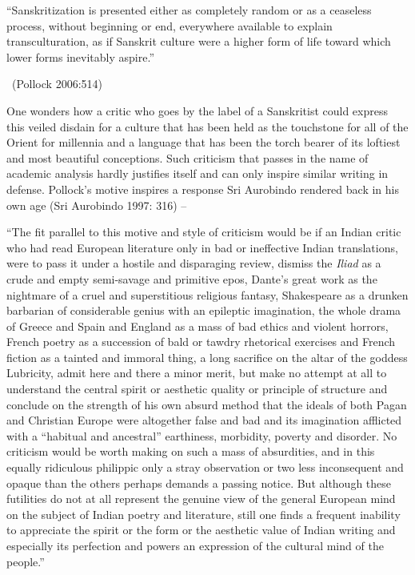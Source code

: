 \begin{myquote}
“Sanskritization is presented either as completely random or as a ceaseless process, without beginning or end, everywhere available to explain transculturation, as if Sanskrit culture were a higher form of life toward which lower forms inevitably aspire.” 

~\hfill (Pollock 2006:514)
\end{myquote}

One wonders how a critic who goes by the label of a Sanskritist could express this veiled disdain for a culture that has been held as the touchstone for all of the Orient for millennia and a language that has been the torch bearer of its loftiest and most beautiful conceptions. Such criticism that passes in the name of academic analysis hardly justifies itself and can only inspire similar writing in defense. Pollock’s motive inspires a response Sri Aurobindo rendered back in his own age (Sri Aurobindo 1997: 316) –

\begin{myquote}
“The fit parallel to this motive and style of criticism would be if an Indian critic who had read European literature only in bad or ineffective Indian translations, were to pass it under a hostile and disparaging review, dismiss the \textit{Iliad} as a crude and empty semi-savage and primitive epos, Dante’s great work as the nightmare of a cruel and superstitious religious fantasy, Shakespeare as a drunken barbarian of considerable genius with an epileptic imagination, the whole drama of Greece and Spain and England as a mass of bad ethics and violent horrors, French poetry as a succession of bald or tawdry rhetorical exercises and French fiction as a tainted and immoral thing, a long sacrifice on the altar of the goddess Lubricity, admit here and there a minor merit, but make no attempt at all to understand the central spirit or aesthetic quality or principle of structure and conclude on the strength of his own absurd method that the ideals of both Pagan and Christian Europe were altogether false and bad and its imagination afflicted with a “habitual and ancestral” earthiness, morbidity, poverty and disorder. No criticism would be worth making on such a mass of absurdities, and in this equally ridiculous philippic only a stray observation or two less inconsequent and opaque than the others perhaps demands a passing notice. But although these futilities do not at all represent the genuine view of the general European mind on the subject of Indian poetry and literature, still one finds a frequent inability to appreciate the spirit or the form or the aesthetic value of Indian writing and especially its perfection and powers an expression of the cultural mind of the people.”
\end{myquote}

